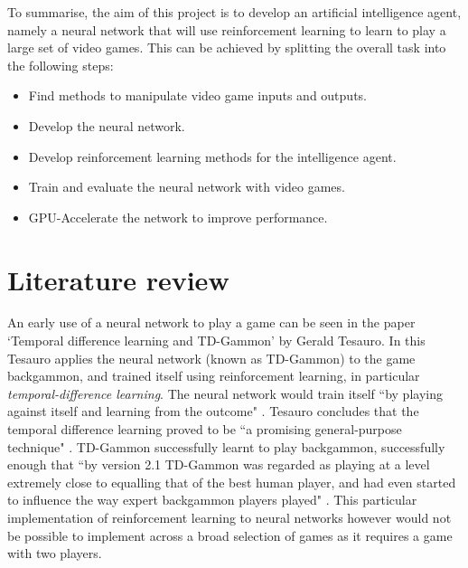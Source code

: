 \documentclass[10pt]{article}
\begin{document}
	To summarise, the aim of this project is to develop an artificial intelligence agent, namely a neural network that will use reinforcement learning to learn to play a large set of video games. This can be achieved by splitting the overall task into the following steps:
	
	\begin{itemize}
		\item Find methods to manipulate video game inputs and outputs.
		\item Develop the neural network.
		\item Develop reinforcement learning methods for the intelligence agent.
		\item Train and evaluate the neural network with video games.
		\item GPU-Accelerate the network to improve performance.
	\end{itemize}
	
	\bigskip

\section{Literature review}
	
		
		An early use of a neural network to play a game can be seen in the paper `Temporal difference learning and TD-Gammon' by Gerald Tesauro. In this Tesauro applies the neural network (known as TD-Gammon) to the game backgammon, and trained itself using reinforcement learning, in particular \textit{temporal-difference learning}. The neural network would train itself ``by playing against itself and learning from the outcome" \cite{tdgammon}. Tesauro concludes that the temporal difference learning proved to be ``a promising general-purpose technique" \cite{tdgammon}. TD-Gammon successfully learnt to play backgammon, successfully enough that ``by version 2.1 TD-Gammon was regarded as playing at a level extremely close to equalling that of the best human player, and had even started to influence the way expert backgammon players played" \cite{tdgammon}. This particular implementation of reinforcement learning to neural networks however would not be possible to implement across a broad selection of games as it requires a game with two players.\\
		
\end{document}
